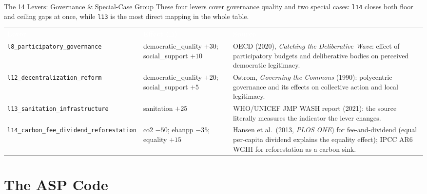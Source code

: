 \documentclass[11pt,aspectratio=169]{beamer}
\newcommand{\tblhead}[1]{\textcolor{white}{\textbf{#1}}}
\begin{document}
\begin{frame}{The 14 Levers: Governance \& Special-Case Group}
  \scriptsize
  These four levers cover \alert{governance quality} and two special cases: \texttt{l14} closes both floor and ceiling gaps at once, while \texttt{l13} is the most direct mapping in the whole table.
  \renewcommand{\arraystretch}{0.92}
  \begin{tabular}{@{}p{3.1cm}p{3.6cm}p{5cm}@{}}
    \rowcolor{doughnutblue} \tblhead{Lever} & \tblhead{Effect ($\Delta$)} & \tblhead{Source} \\
    \texttt{l8\_participatory\_\allowbreak governance} & democratic\_quality $+30$; social\_support $+10$ &
      OECD (2020), \emph{Catching the Deliberative Wave}: effect of participatory budgets and deliberative bodies on perceived democratic legitimacy. \\
    \texttt{l12\_decentralization\_\allowbreak reform} & democratic\_quality $+20$; social\_support $+5$ &
      Ostrom, \emph{Governing the Commons} (1990): polycentric governance and its effects on collective action and local legitimacy. \\
    \texttt{l13\_sanitation\_\allowbreak infrastructure} & sanitation $+25$ &
      WHO/UNICEF JMP WASH report (2021): the source literally measures the indicator the lever changes. \\
    \texttt{l14\_carbon\_fee\_\allowbreak dividend\_\allowbreak reforestation} & co2 $-50$; ehanpp $-35$; equality $+15$ &
      Hansen et al.\ (2013, \emph{PLOS ONE}) for fee-and-dividend (equal per-capita dividend explains the equality effect); IPCC AR6 WGIII for reforestation as a carbon sink. \\
  \end{tabular}
\end{frame}

\section[ASP Code]{The ASP Code}
\end{document}
